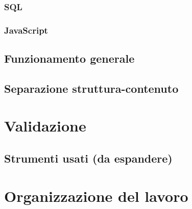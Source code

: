 \documentclass[a4paper, oneside, openany, dvipsnames, table]{article}
\begin{document}
		\subsubsection{SQL}
			
		\subsubsection{JavaScript}
			
	\subsection{Funzionamento generale}
		
	\subsection{Separazione struttura-contenuto}
		
	
\newpage
\section{Validazione}
	
	\subsection{Strumenti usati (da espandere)}
		
	
\newpage
\section{Organizzazione del lavoro}
	
\end{document}
